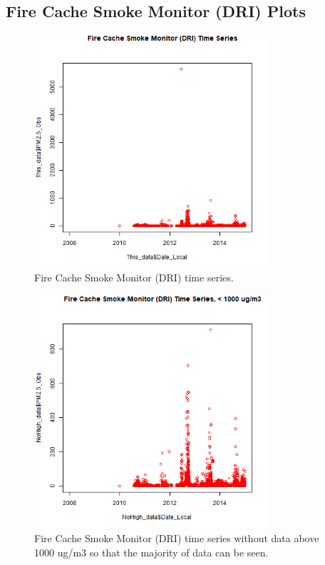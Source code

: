 
\subsection{Fire Cache Smoke Monitor (DRI) Plots}
\begin{figure} 
\centering 
\includegraphics[width=0.77\textwidth]{Code_Outputs/FireCacheDRI_time_series.png} 
\caption{\label{fig:FireCacheDRITS}Fire Cache Smoke Monitor (DRI) time series.} 
\end{figure} 
 

\begin{figure} 
\centering 
\includegraphics[width=0.77\textwidth]{Code_Outputs/FireCacheDRI_time_series_below_1000ugm3.png} 
\caption{\label{fig:FireCacheDRITSnoHigh}Fire Cache Smoke Monitor (DRI) time series without data above 1000 ug/m3 so that the majority of data can be seen.} 
\end{figure} 
 
